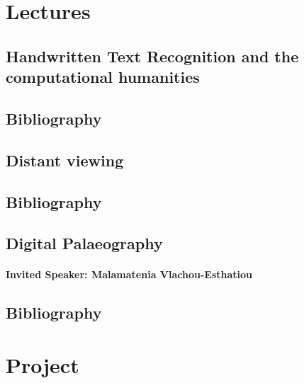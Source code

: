 \documentclass{report}
\begin{document}
\section{Lectures}

\subsection{Handwritten Text Recognition and the computational humanities}

\subsection*{Bibliography}

\subsection{Distant viewing}

\subsection*{Bibliography}

\cite{arnodchr2022}

\cite{lang2023}

\subsection{Digital Palaeography}

\paragraph{Invited Speaker: Malamatenia Vlachou-Esthatiou}

\subsection*{Bibliography}

\section{Project}
\end{document}
